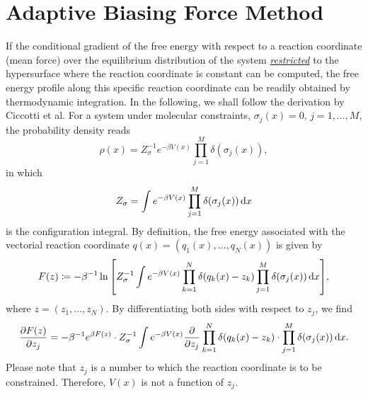 \section{Adaptive Biasing Force Method\label{Sec:ES:ABF}}
If the conditional gradient of the free energy with respect to a reaction coordinate (mean force) over the equilibrium distribution of the system \underline{\textit{restricted}} to the hypersurface where the reaction coordinate is constant can be computed, the free energy profile along this specific reaction coordinate can be readily obtained by thermodynamic integration. In the following, we shall follow the derivation by Ciccotti et al.\cite{CiccottiCPC2005}
For a system under molecular constraints, $\sigma_j(x)=0,\, j=1,\dots,M$, the probability density reads
\begin{equation}
	\rho(x)=Z_\sigma^{-1}e^{-\beta V(x)}\prod_{j=1}^M\delta(\sigma_j(x)),
\end{equation}
in which
\begin{equation}
	Z_\sigma=\int e^{-\beta V(x)}\prod_{j=1}^M\delta(\sigma_j(x))\mathop{}\!\mathrm{d} x
\end{equation}
is the configuration integral. By definition, the free energy associated with the vectorial reaction coordinate $q(x)=(q_1(x),\dots,q_N(x))$ is given by
\begin{equation}
	F(z)\coloneqq -\beta^{-1}\ln{\left[Z_\sigma^{-1}\int e^{-\beta V(x)}\prod_{k=1}^{N}\delta(q_k(x)-z_k)\prod_{j=1}^M\delta(\sigma_j(x))\mathop{}\!\mathrm{d}x\right]},
\end{equation}
where $z=(z_1,\dots,z_N)$. By differentiating both sides with respect to $z_j$, we find
\begin{equation}
    \frac{\partial F(z)}{\partial z_j}=-\beta^{-1}e^{\beta F(z)}\cdot Z_\sigma^{-1} \int e^{-\beta V(x)}\frac{\partial}{\partial z_j}\prod_{k=1}^{N}\delta(q_k(x)-z_k)\cdot \prod_{j=1}^M\delta(\sigma_j(x))\mathop{}\!\mathrm{d} x.
\end{equation}
Please note that $z_j$ is a number to which the reaction coordinate is to be constrained. Therefore, $V(x)$ is not a function of $z_j$.

